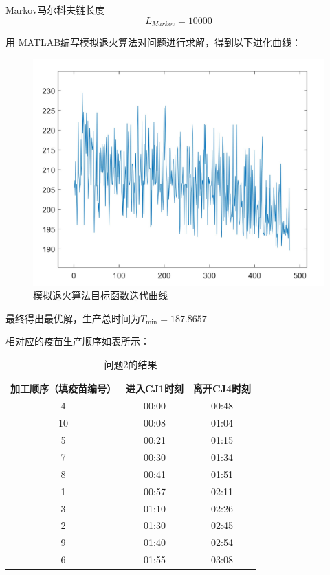 \documentclass[UTF8]{ctexart}
\begin{document}
\begin{enumerate}
		\qquad Markov马尔科夫链长度
		\begin{equation*}
		L_{Markov} = 10000
		\end{equation*}
		
		\qquad 用 MATLAB编写模拟退火算法对问题进行求解，得到以下进化曲线：
		\begin{figure}[H]
			\centering %
			\includegraphics[scale=0.5]{2_moni.jpg}
			\caption{模拟退火算法目标函数迭代曲线}
		\end{figure}

	最终得出最优解，生产总时间为$ T_{\min} = 187.8657 $
	
	相对应的疫苗生产顺序如表所示：
	\begin{table}[H]
		\centering
		\caption{问题2的结果}
		\begin{tabular}{ c| c| c }
			\hline
			加工顺序（填疫苗编号） & 进入CJ1时刻 & 离开CJ4时刻 \\
			\hline
			 4 & 00:00 & 00:48 \\
			 \hline
			 10 & 00:08 & 01:04 \\
			 \hline
			 5 & 00:21 & 01:15 \\
			 \hline
			 7 &  00:30 & 01:34\\
			 \hline
			 8 & 00:41 & 01:51\\
			 \hline
			 1 &  00:57 & 02:11\\
			 \hline
			 3 & 01:10 & 02:26\\
			 \hline
			 2 & 01:30 & 02:45\\
			 \hline
			 9 &  01:40 & 02:54\\
			 \hline
			 6 & 01:55 & 03:08 \\
			\hline
		\end{tabular}
	\end{table}


\end{enumerate}
\end{document}
